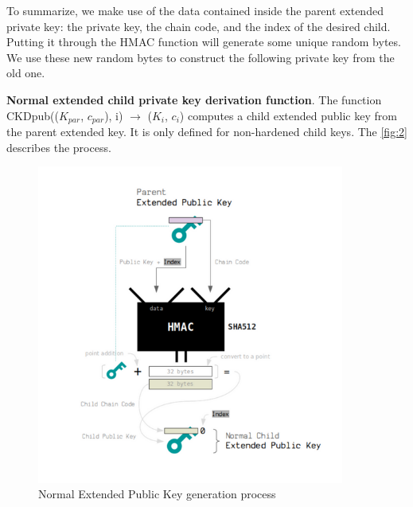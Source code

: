 To summarize, we make use of the data contained inside the parent extended private key: the private key, the chain code, and the index of the desired child. Putting it through the HMAC function will generate some unique random bytes. We use these new random bytes to construct the following private key from the old one.

\bigskip
{\textbf{Normal extended child private key derivation function}}. \label{norm2}The function CKDpub(($K_{par}$, $c_{par}$), i) $\rightarrow$ ($K_i$, $c_i$) computes a child extended public key from the parent extended key. It is only defined for non-hardened child keys.
The \autoref{fig:2} describes the process.

\begin{figure}[ht!]
    \centering
    \includegraphics[width=0.9\textwidth]{images/normal_pub_gen.png}
    \caption[Normal Extended Public Key generation process]{Normal Extended Public Key generation process \cite{learnme}}
    \label{fig:2}
\end{figure}

